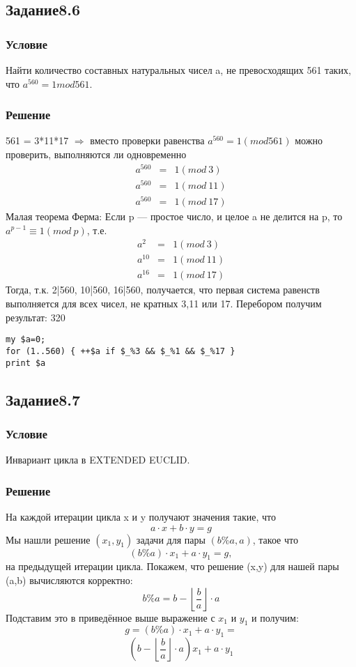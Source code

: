 \documentclass[10pt,a4paper]{article}
\begin{document}
\subsection*{Задание8.6}
\subsubsection*{Условие}
Найти количество составных натуральных чисел a, не превосходящих 561
таких, что $a^{560}=1 mod 561$.
\subsubsection*{Решение}
561 = 3*11*17 $\Rightarrow$ вместо проверки равенства $a^{560} = 1
(mod 561)$ можно проверить, выполняются ли одновременно
\begin{eqnarray*}
a^{560} & = & 1 (mod\ 3)  \\
a^{560} & = & 1 (mod\ 11)  \\
a^{560} & = & 1 (mod\ 17)  
\end{eqnarray*}
Малая теорема Ферма:
Если p — простое число, и целое a не делится на p, то 
$a^{p-1} ≡ 1 (mod\ p)$, т.е.
\begin{eqnarray*}
a^{2} & = & 1 (mod\ 3)  \\
a^{10} & = & 1 (mod\ 11)  \\
a^{16} & = & 1 (mod\ 17)  
\end{eqnarray*}
Тогда, т.к. 2|560, 10|560, 16|560, получается, что первая система
равенств выполняется для всех чисел, не кратных 3,11 или 17. Перебором
получим результат: 320
\begin{lstlisting}
my $a=0; 
for (1..560) { ++$a if $_%3 && $_%1 && $_%17 } 
print $a
\end{lstlisting}


\subsection*{Задание8.7}
\subsubsection*{Условие}
Инвариант цикла в EXTENDED EUCLID.
\subsubsection*{Решение}
На каждой итерации цикла x и y получают значения такие, что
$$ a \cdot x + b \cdot y = g $$
Мы нашли решение $(x_1,y_1)$ задачи для пары $(b\%a,a)$, такое что
$$ (b \% a) \cdot x_1 + a \cdot y_1 = g, $$
на предыдущей итерации цикла.
Покажем, что решение (x,y) для нашей пары (a,b) вычисляются корректно:
$$ b \% a = b - \left\lfloor \frac{b}{a} \right\rfloor \cdot a $$
Подставим это в приведённое выше выражение с $x_1$ и $y_1$ и получим:
$$ g = (b \% a) \cdot x_1 + a \cdot y_1 = $$
\[
\left( b - \left\lfloor \frac{b}{a} \right\rfloor \cdot a \right)
 x_1 + a \cdot y_1 
\]
\end{document}

